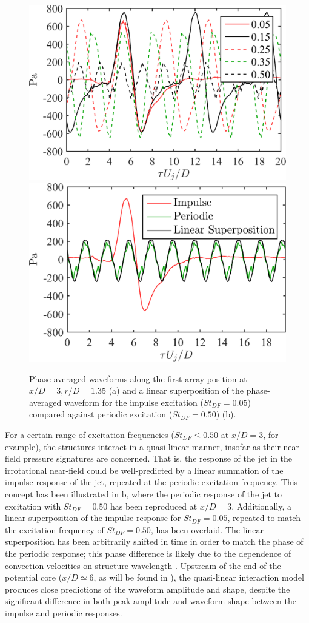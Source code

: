 \begin{figure}
	\centering
	\includegraphics[width=0.45\linewidth]{Figures/ch3_nearfield_phavg_v2.png}
	\includegraphics[width=0.45\linewidth]{Figures/ch3_nearfield_linear_v2.png}
	\caption{Phase-averaged waveforms along the first array position at $x/D = 3, r/D = 1.35$ (a) and a linear superposition of the phase-averaged waveform for the impulse excitation ($St_{DF} = 0.05$) compared against periodic excitation ($St_{DF} = 0.50$) (b).}
	\label{fig:ch3_nearfield}
\end{figure}

For a certain range of excitation frequencies ($St_{DF} \leq 0.50$ at $x/D = 3$, for example), the structures interact in a quasi-linear manner, insofar as their near-field pressure signatures are concerned. 
That is, the response of the jet in the irrotational near-field could be well-predicted by a linear summation of the impulse response of the jet, repeated at the periodic excitation frequency. 
This concept has been illustrated in b, where the periodic response of the jet to excitation with $St_{DF} = 0.50$ has been reproduced at $x/D = 3$. 
Additionally, a linear superposition of the impulse response for $St_{DF} = 0.05$, repeated to match the excitation frequency of $St_{DF} = 0.50$, has been overlaid. 
The linear superposition has been arbitrarily shifted in time in order to match the phase of the periodic response; this phase difference is likely due to the dependence of convection velocities on structure wavelength \citep{Veltin2011}. 
Upstream of the end of the potential core ($x/D \simeq 6$, as will be found in ), the quasi-linear interaction model produces close predictions of the waveform amplitude and shape, despite the significant difference in both peak amplitude and waveform shape between the impulse and periodic responses. 

